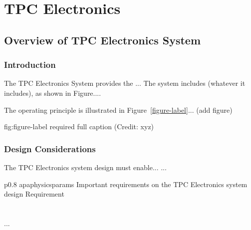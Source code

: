 \chapter{TPC Electronics}
\label{ch:fdsp-tpc-elec}

\section{Overview of TPC Electronics System}
\label{sec:fdsp-tpc-elec-ov}


\subsection{Introduction}
\label{sec:fdsp-tpc-elec-intro}

The TPC Electronics System provides the ...
The system includes (whatever it includes), as shown in Figure.... 


The operating principle is illustrated in Figure~\ref{figure-label}... (add figure)

\begin{dunefigure}{fig:figure-label}
{required full caption (Credit: xyz)}
\end{dunefigure}

\subsection{Design Considerations}
\label{sec:fdsp-tpc-elec-des-consid}


The TPC Electronics system design must enable... 
...


\begin{dunetable}
{p{0.8\textwidth}}
{apaphysicsparams}
{Important requirements on the TPC Electronics system design}   
Requirement  \\ \toprowrule
  \\ \colhline
   \\ \colhline
 ...\\ 
\end{dunetable}

